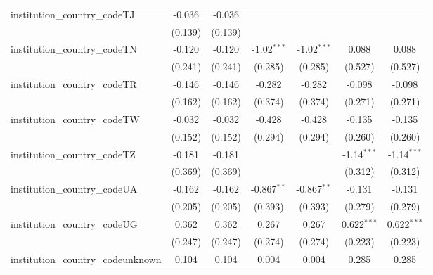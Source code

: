 \begin{tabular}{lcccccc}
   institution\_country\_codeTJ          & -0.036         & -0.036         &                &                &                &   \\   
                                         & (0.139)        & (0.139)        &                &                &                &   \\   
   institution\_country\_codeTN          & -0.120         & -0.120         & -1.02$^{***}$  & -1.02$^{***}$  & 0.088          & 0.088\\   
                                         & (0.241)        & (0.241)        & (0.285)        & (0.285)        & (0.527)        & (0.527)\\   
   institution\_country\_codeTR          & -0.146         & -0.146         & -0.282         & -0.282         & -0.098         & -0.098\\   
                                         & (0.162)        & (0.162)        & (0.374)        & (0.374)        & (0.271)        & (0.271)\\   
   institution\_country\_codeTW          & -0.032         & -0.032         & -0.428         & -0.428         & -0.135         & -0.135\\   
                                         & (0.152)        & (0.152)        & (0.294)        & (0.294)        & (0.260)        & (0.260)\\   
   institution\_country\_codeTZ          & -0.181         & -0.181         &                &                & -1.14$^{***}$  & -1.14$^{***}$\\   
                                         & (0.369)        & (0.369)        &                &                & (0.312)        & (0.312)\\   
   institution\_country\_codeUA          & -0.162         & -0.162         & -0.867$^{**}$  & -0.867$^{**}$  & -0.131         & -0.131\\   
                                         & (0.205)        & (0.205)        & (0.393)        & (0.393)        & (0.279)        & (0.279)\\   
   institution\_country\_codeUG          & 0.362          & 0.362          & 0.267          & 0.267          & 0.622$^{***}$  & 0.622$^{***}$\\   
                                         & (0.247)        & (0.247)        & (0.274)        & (0.274)        & (0.223)        & (0.223)\\   
   institution\_country\_codeunknown     & 0.104          & 0.104          & 0.004          & 0.004          & 0.285          & 0.285\\   

\end{tabular}

